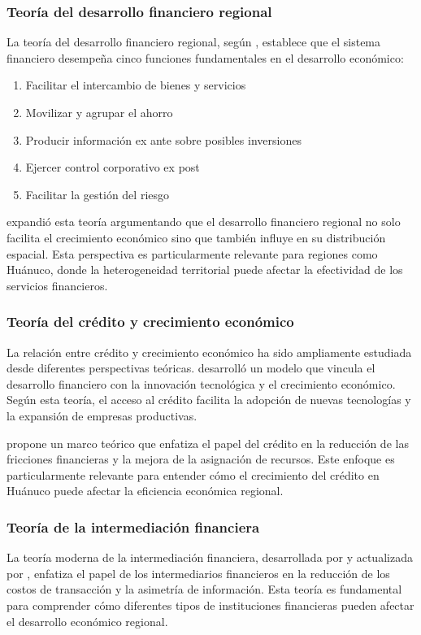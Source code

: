 \documentclass[12pt, a4paper]{article}
\begin{document}
\subsubsection{Teoría del desarrollo financiero regional}
La teoría del desarrollo financiero regional, según \textcite{King1993}, establece que el sistema financiero desempeña cinco funciones fundamentales en el desarrollo económico:
\begin{enumerate}
    \item Facilitar el intercambio de bienes y servicios
    \item Movilizar y agrupar el ahorro
    \item Producir información ex ante sobre posibles inversiones
    \item Ejercer control corporativo ex post
    \item Facilitar la gestión del riesgo
\end{enumerate}

\textcite{Levine2005} expandió esta teoría argumentando que el desarrollo financiero regional no solo facilita el crecimiento económico sino que también influye en su distribución espacial. Esta perspectiva es particularmente relevante para regiones como Huánuco, donde la heterogeneidad territorial puede afectar la efectividad de los servicios financieros.

\subsubsection{Teoría del crédito y crecimiento económico}
La relación entre crédito y crecimiento económico ha sido ampliamente estudiada desde diferentes perspectivas teóricas. \textcite{Aghion2019} desarrolló un modelo que vincula el desarrollo financiero con la innovación tecnológica y el crecimiento económico. Según esta teoría, el acceso al crédito facilita la adopción de nuevas tecnologías y la expansión de empresas productivas.

\textcite{Rajan2023} propone un marco teórico que enfatiza el papel del crédito en la reducción de las fricciones financieras y la mejora de la asignación de recursos. Este enfoque es particularmente relevante para entender cómo el crecimiento del crédito en Huánuco puede afectar la eficiencia económica regional.

\subsubsection{Teoría de la intermediación financiera}
La teoría moderna de la intermediación financiera, desarrollada por \textcite{Diamond1984} y actualizada por \textcite{Allen2022}, enfatiza el papel de los intermediarios financieros en la reducción de los costos de transacción y la asimetría de información. Esta teoría es fundamental para comprender cómo diferentes tipos de instituciones financieras pueden afectar el desarrollo económico regional.
\end{document}
